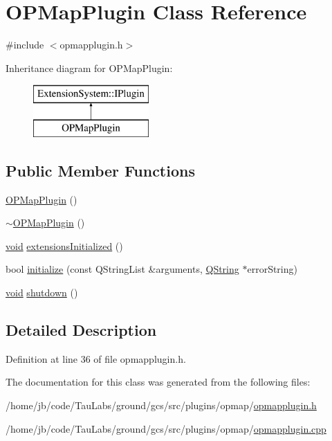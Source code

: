 \hypertarget{class_o_p_map_plugin}{\section{\-O\-P\-Map\-Plugin \-Class \-Reference}
\label{class_o_p_map_plugin}
}


{\ttfamily \#include $<$opmapplugin.\-h$>$}

\-Inheritance diagram for \-O\-P\-Map\-Plugin\-:\begin{figure}[H]
\begin{center}
\leavevmode
\includegraphics[height=2.000000cm]{class_o_p_map_plugin}
\end{center}
\end{figure}
\subsection*{\-Public \-Member \-Functions}
\begin{DoxyCompactItemize}
\item 
\hyperlink{group___o_p_map_plugin_ga1c402cf38d48ab5c7dacf62490bb5bc2}{\-O\-P\-Map\-Plugin} ()
\item 
\hyperlink{group___o_p_map_plugin_gaa1ca844e6b44f8013f6ad72889055c41}{$\sim$\-O\-P\-Map\-Plugin} ()
\item 
\hyperlink{group___u_a_v_objects_plugin_ga444cf2ff3f0ecbe028adce838d373f5c}{void} \hyperlink{group___o_p_map_plugin_ga4698621f6178bff1aad1d856fbcc3e08}{extensions\-Initialized} ()
\item 
bool \hyperlink{group___o_p_map_plugin_gac6a236b2b4276677428bd2305710a2d7}{initialize} (const \-Q\-String\-List \&arguments, \hyperlink{group___u_a_v_objects_plugin_gab9d252f49c333c94a72f97ce3105a32d}{\-Q\-String} $\ast$error\-String)
\item 
\hyperlink{group___u_a_v_objects_plugin_ga444cf2ff3f0ecbe028adce838d373f5c}{void} \hyperlink{group___o_p_map_plugin_ga76c3d81f95369b3c96c26739bc07e506}{shutdown} ()
\end{DoxyCompactItemize}


\subsection{\-Detailed \-Description}


\-Definition at line 36 of file opmapplugin.\-h.



\-The documentation for this class was generated from the following files\-:\begin{DoxyCompactItemize}
\item 
/home/jb/code/\-Tau\-Labs/ground/gcs/src/plugins/opmap/\hyperlink{opmapplugin_8h}{opmapplugin.\-h}\item 
/home/jb/code/\-Tau\-Labs/ground/gcs/src/plugins/opmap/\hyperlink{opmapplugin_8cpp}{opmapplugin.\-cpp}\end{DoxyCompactItemize}
